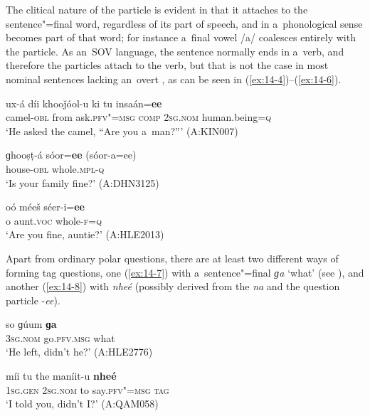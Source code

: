 The clitical nature of the particle is evident in that it attaches to the sentence"=final word, regardless of its part of speech, and in a~phonological sense becomes part of that word; for instance a~final vowel /a/ coalesces entirely with the particle. As an~SOV language, the sentence normally ends in a~verb, and therefore the particles attach to the verb, but that is not the case in most nominal sentences lacking an~overt , as can be seen in (\ref{ex:14-4})--(\ref{ex:14-6}).

\begin{exe}
\ex
\label{ex:14-4}
\gll ux-á díi khooǰóol-u ki tu insaán=\textbf{ee} \\
camel-\textsc{obl} from ask.\textsc{pfv"=msg} \textsc{comp} \textsc{2sg.nom} human.being=\textsc{q} \\
\glt `He asked the camel, ``Are you a~man?''' (A:KIN007)

\ex
\label{ex:14-5}
\gll ɡhooṣṭ-á sóor=\textbf{ee} (sóor-a=ee) \\
house-\textsc{obl} whole.\textsc{mpl-q} \\
\glt `Is your family fine?' (A:DHN3125)

\ex
\label{ex:14-6}
\gll oó méeš séer-i=\textbf{ee} \\
o aunt.\textsc{voc} whole-\textsc{f=q} \\
\glt `Are you fine, auntie?' (A:HLE2013)
\end{exe}

Apart from ordinary polar questions, there are at least two different ways of forming tag questions, one (\ref{ex:14-7}) with a~sentence"=final \textit{ɡa} `what' (see ), and another (\ref{ex:14-8}) with \textit{nheé} (possibly derived from the  \textit{na} and the question particle -\textit{ee}).

\begin{exe}
\ex
\label{ex:14-7}
\gll so ɡúum \textbf{ɡa} \\
\textsc{3sg.nom} go.\textsc{pfv.msg} what \\
\glt `He left, didn't he?' (A:HLE2776)

\ex
\label{ex:14-8}
\gll míi tu the maníit-u \textbf{nheé} \\
\textsc{1sg.gen} \textsc{2sg.nom} to say.\textsc{pfv"=msg} \textsc{tag} \\
\glt `I told you, didn't I?' (A:QAM058)
\end{exe}

